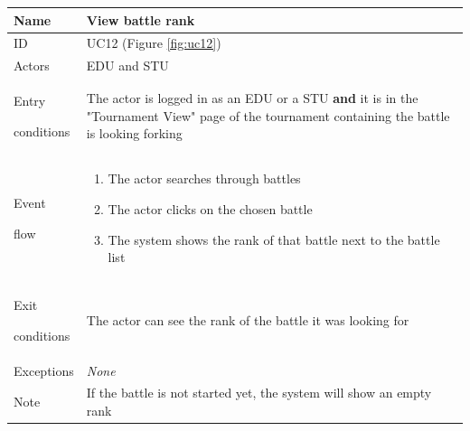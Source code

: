 \begin{center}
    \def\arraystretch{1.5}
    \begin{tabular}{| m{2cm} | m{10cm}|}
        \hline
        Name                  & View battle rank                                                                                                                                            \\ \hline
        ID                    & UC12 (Figure \ref{fig:uc12})                                                                                                                                \\ \hline
        Actors                & EDU and STU                                                                                                                                                 \\ \hline
        Entry \par conditions & The actor is logged in as an EDU or a STU \textbf{and} it is in the "Tournament View" page of the tournament containing the battle is looking forking       \\ \hline
        Event \par flow       & \begin{enumerate}
                                    \item The actor searches through battles
                                    \item The actor clicks on the chosen battle
                                    \item The system shows the rank of that battle next to the battle list
                                \end{enumerate}                                                                                                                                             \\ \hline
        Exit \par conditions  & The actor can see the rank of the battle it was looking for                                                                                                 \\ \hline
        Exceptions            & \textit{None}                                                                                                                                               \\ \hline
        Note                  & If the battle is not started yet, the system will show an empty rank                                                                                        \\ \hline
    \end{tabular}
\end{center}

